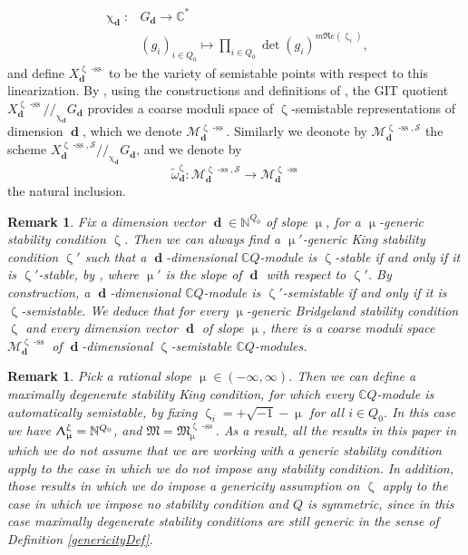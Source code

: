 \documentclass[a4paper,10pt]{amsart}
\renewcommand{\zeta}{\upzeta}
\renewcommand{\chi}{\upchi}
\renewcommand{\Lambda}{\Uplambda}
\renewcommand{\mu}{\upmu}
\newtheorem{remark}[theorem]{Remark}
\newcommand{\SP}{\mathcal{S}}
\newcommand{\Mst}{\mathfrak{M}}
\newcommand{\Msp}{\mathcal{M}}
\DeclareMathOperator{\sst}{-ss}
\DeclareMathOperator{\dd}{\mathbf{d}}
\begin{document}
\begin{align}
\label{charDef}
\chi_{\dd}\colon &G_{\dd}\rightarrow \mathbb{C}^*\\&(g_i)_{i\in Q_0}\mapsto \prod_{i\in Q_0}\det(g_i)^{m\Re e(\zeta_i)}, \nonumber
\end{align}
and define $X_{\dd}^{\zeta\sst}$ to be the variety of semistable points with respect to this linearization.  By \cite{King}, using the constructions and definitions of \cite{MFK94}, the GIT quotient $X^{\zeta\sst}_{\dd}/\!\!/_{\chi_{\dd}} G_{\dd}$ provides a coarse moduli space of $\zeta$-semistable representations of dimension ${\dd}$, which we denote $\Msp^{\zeta\sst}_{\dd}$.  Similarly we deonote by $\Msp^{\zeta\sst,\SP}_{\dd}$ the scheme $X^{\zeta\sst,\SP}_{\dd}/\!\!/_{\chi_{\dd}} G_{\dd}$, and we denote by 
\begin{equation}
\label{tomdef}
\tilde{\omega}^{\zeta}_{\dd}\colon\Msp^{\zeta\sst,\SP}_{\dd}\rightarrow\Msp^{\zeta\sst}_{\dd}
\end{equation}
the natural inclusion.
\begin{remark}
\label{BtoK}
Fix a dimension vector $\dd\in\mathbb{N}^{Q_0}$ of slope $\mu$, for a $\mu$-generic stability condition $\zeta$.  Then we can always find a $\mu'$-generic King stability condition $\zeta'$ such that a $\dd$-dimensional $\mathbb{C} Q$-module is $\zeta$-stable if and only if it is $\zeta'$-stable, by \cite[Lem.4.21]{DMSS15}, where $\mu'$ is the slope of $\dd$ with respect to $\zeta'$.  By construction, a $\dd$-dimensional $\mathbb{C}Q$-module is $\zeta'$-semistable if and only if it is $\zeta$-semistable.  We deduce that for every $\mu$-generic Bridgeland stability condition $\zeta$ and every dimension vector $\dd$ of slope $\mu$, there is a coarse moduli space $\Msp^{\zeta\sst}_{\dd}$ of $\dd$-dimensional $\zeta$-semistable $\mathbb{C}Q$-modules.  
\end{remark}
\begin{remark}
Pick a rational slope $\mu\in (-\infty,\infty)$.  Then we can define a maximally degenerate stability King condition, for which every $\mathbb{C}Q$-module is automatically semistable, by fixing $\zeta_i=+\sqrt{-1}-\mu$ for all $i\in Q_0$.  In this case we have $\Lambda_{\mu}^{\zeta}=\mathbb{N}^{Q_0}$, and $\Mst=\Mst^{\zeta\sst}_{\mu}$.  As a result, all the results in this paper in which we do not assume that we are working with a generic stability condition apply to the case in which we do not impose any stability condition.  In addition, those results in which we do impose a genericity assumption on $\zeta$ apply to the case in which we impose no stability condition and $Q$ is symmetric, since in this case maximally degenerate stability conditions are still generic in the sense of Definition \ref{genericityDef}.
\end{remark}
\end{document}
